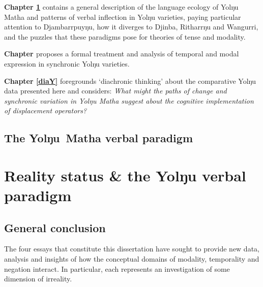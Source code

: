 \documentclass[12pt,dvipsnames]{report}
\newcommand{\mcom}[1]
{\marginpar{\color{black}\raggedleft\raggedright\hspace{0pt}\linespread{0.9}\footnotesize{#1}}}
\begin{document}
		\textbf{Chapter \ref{descY}} contains a general description of the language ecology of Yolŋu Matha and patterns of verbal inflection in Yolŋu varieties, paying particular attention to Djambarrpuyŋu, how it diverges to Djinba, Ritharrŋu and Wangurri, and the puzzles that these paradigms pose for theories of tense and modality.
		
		\textbf{Chapter \ref{anY}} proposes a formal treatment and analysis of temporal and modal expression in synchronic Yolŋu varieties.
		
		\textbf{Chapter \ref{diaY} }foregrounds `diachronic thinking' about the comparative Yolŋu data presented here and considers: {\em What might the paths of change and synchronic variation in Yolŋu Matha suggest about the cognitive implementation of displacement operators?}
		\vfill
		
		\upshape 
	\chapter{The Yolŋu~Matha verbal paradigm}\label{descY}
\fi


\part{Reality status \& the Yolŋu verbal paradigm}\label{anY}\label{yolŋu}
%


%

\chapter*{General conclusion}



The four essays that constitute this dissertation have sought to provide new data, analysis and insights of how the conceptual domains of modality, temporality and negation interact. In particular, each represents an investigation of some dimension of irreality.
\end{document}
